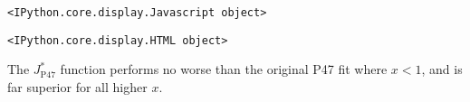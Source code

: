 \documentclass[11pt]{article}
\begin{document}
    
    \begin{verbatim}
<IPython.core.display.Javascript object>
    \end{verbatim}

    
    
    \begin{verbatim}
<IPython.core.display.HTML object>
    \end{verbatim}

    
    The \(J_{\mathrm{P}47}^*\) function performs no worse than the original
P47 fit where \(x < 1\), and is far superior for all higher \(x\).


    
    
    
    
\end{document}
